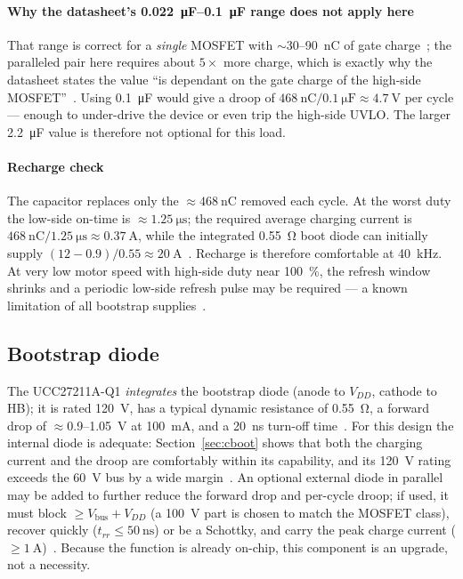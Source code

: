 \documentclass[journal,onecolumn,11pt]{IEEEtran}
\newcommand{\Vbus}{V_{\mathrm{bus}}}
\begin{document}
\paragraph{Why the datasheet's \SIrange{0.022}{0.1}{\micro\farad} range does not apply here}
That range is correct for a \emph{single} MOSFET with $\sim$30--\SI{90}{\nano\coulomb} of gate
charge~\cite{ucc27211}; the paralleled pair here requires about $5\times$ more charge, which is
exactly why the datasheet states the value ``is dependant on the gate charge of the high-side
MOSFET''~\cite{ucc27211}. Using \SI{0.1}{\micro\farad} would give a droop of
$\SI{468}{\nano\coulomb}/\SI{0.1}{\micro\farad}\approx\SI{4.7}{\volt}$ per cycle --- enough to
under-drive the device or even trip the high-side UVLO. The larger \SI{2.2}{\micro\farad} value is
therefore not optional for this load.

\paragraph{Recharge check} The capacitor replaces only the $\approx\SI{468}{\nano\coulomb}$ removed
each cycle. At the worst duty the low-side on-time is $\approx\SI{1.25}{\micro\second}$; the required
average charging current is $\SI{468}{\nano\coulomb}/\SI{1.25}{\micro\second}\approx\SI{0.37}{\ampere}$,
while the integrated \SI{0.55}{\ohm} boot diode can initially supply
$(12-0.9)/0.55\approx\SI{20}{\ampere}$~\cite{ucc27211}. Recharge is therefore comfortable at
\SI{40}{\kilo\hertz}. At very low motor speed with high-side duty near \SI{100}{\percent}, the
refresh window shrinks and a periodic low-side refresh pulse may be required --- a known limitation
of all bootstrap supplies~\cite{ir_an978,ir_an1123}.

\subsection{Bootstrap diode}
The UCC27211A-Q1 \emph{integrates} the bootstrap diode (anode to $V_{DD}$, cathode to HB); it is
rated \SI{120}{\volt}, has a typical dynamic resistance of \SI{0.55}{\ohm}, a forward drop of
$\approx$0.9--\SI{1.05}{\volt} at \SI{100}{\milli\ampere}, and a \SI{20}{\nano\second} turn-off
time~\cite{ucc27211}. For this design the internal diode is adequate: Section~\ref{sec:cboot} shows
that both the charging current and the droop are comfortably within its capability, and its
\SI{120}{\volt} rating exceeds the \SI{60}{\volt} bus by a wide margin~\cite{ucc27211}. An optional
external diode in parallel may be added to further reduce the forward drop and per-cycle droop; if
used, it must block $\ge\Vbus+V_{DD}$ (a \SI{100}{\volt} part is chosen to match the MOSFET class),
recover quickly ($t_{rr}\le\SI{50}{\nano\second}$) or be a Schottky, and carry the peak charge
current ($\ge\SI{1}{\ampere}$)~\cite{ir_an978,ir_an1123}. Because the function is already on-chip,
this component is an upgrade, not a necessity.
\end{document}

